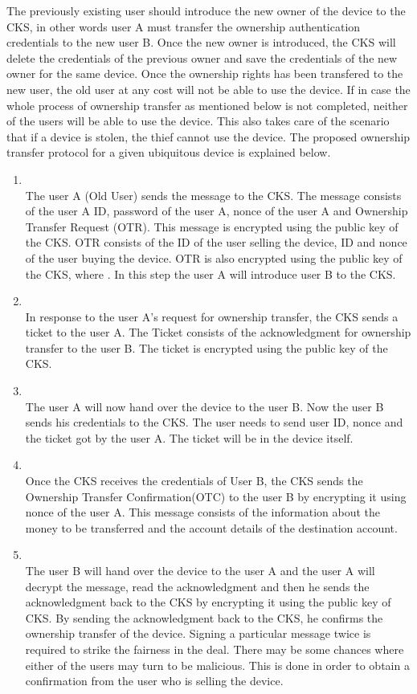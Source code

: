 \documentclass[letterpaper]{article}
\begin{document}
The previously existing user should introduce the new owner of the device to the CKS, in other words user A must transfer the ownership authentication credentials to the new user B. Once the new owner is introduced, the CKS will delete the credentials of the previous owner and save the credentials of the new owner for the same device. Once the ownership rights has been transfered to the new user, the old user at any cost will not be able to use the device. If in case the whole process of ownership transfer as mentioned below is not completed, neither of the users will be able to use the device. This also takes care of the scenario that if a device is stolen, the thief cannot use the device. The proposed ownership transfer protocol for a given ubiquitous device is explained below.
\begin{enumerate}
				\item  \\ 
				The user A (Old User) sends the message to the CKS. The message consists of the user A ID, password of the user A, nonce of the user A and Ownership Transfer Request (OTR). This message is encrypted using the public key of the CKS. OTR consists of the ID of the user selling the device, ID and nonce of the user buying the device. OTR is also encrypted using the public key of the CKS, where . In this step the user A will introduce user B to the CKS.  
				\item  \\ 
				In response to the user A's request for ownership transfer, the CKS sends a ticket to the user A. The Ticket consists of the acknowledgment for ownership transfer to the user B. The ticket is encrypted using the public key of the CKS.
				\item \\ 
				The user A will now hand over the device to the user B. Now the user B sends his credentials to the CKS. The user needs to send user ID, nonce and the ticket got by the user A. The ticket will be in the device itself.   
			 \item \\ 
					Once the CKS receives the credentials of User B, the CKS sends the Ownership Transfer Confirmation(OTC) to the user B by encrypting it using nonce of the user A. This message consists of the information about the money to be transferred and the account details of the destination account. 
				\item \\ 
				The user B will hand over the device to the user A and the user A will decrypt the message, read the acknowledgment and then he sends the acknowledgment back to the CKS by encrypting it using the public key of CKS. By sending the acknowledgment back to the CKS, he confirms the ownership transfer of the device. Signing a particular message twice is required to strike the fairness in the deal. There may be some chances where either of the users may turn to be malicious. This is done in order to obtain a confirmation from the user who is selling the device. 

\end{enumerate}
\end{document}
